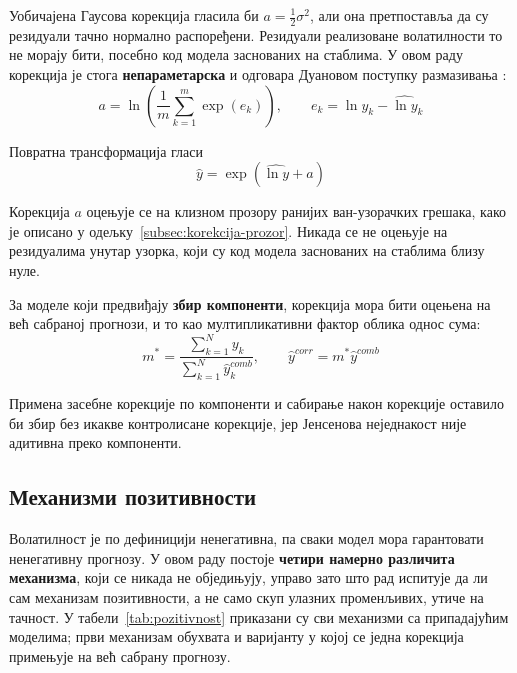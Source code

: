 Уобичајена Гаусова корекција гласила би $a = \tfrac{1}{2}\sigma^{2}$, али она
претпоставља да су резидуали тачно нормално распоређени. Резидуали реализоване
волатилности то не морају бити, посебно код модела заснованих на стаблима. У овом
раду корекција је стога \textbf{непараметарска} и одговара Дуановом поступку
размазивања \parencite{duan1983}:
\begin{equation}
a = \ln\!\left(\frac{1}{m}\sum_{k=1}^{m}\exp(e_k)\right),
\qquad
e_k = \ln y_k - \widehat{\ln y}_k
\label{eq:correction}
\end{equation}

Повратна трансформација гласи
\begin{equation}
\hat{y} = \exp\!\left(\widehat{\ln y} + a\right)
\end{equation}

Корекција $a$ оцењује се на клизном прозору ранијих ван-узорачких грешака, како је
описано у одељку~\ref{subsec:korekcija-prozor}. Никада се не оцењује на резидуалима
унутар узорка, који су код модела заснованих на стаблима близу нуле.

За моделе који предвиђају \textbf{збир компоненти}, корекција мора бити оцењена на
већ сабраној прогнози, и то као мултипликативни фактор облика однос сума:
\begin{equation}
m^{*} = \frac{\sum_{k=1}^{N} y_k}{\sum_{k=1}^{N}\hat{y}_k^{comb}},
\qquad
\hat{y}^{corr} = m^{*}\hat{y}^{comb}
\end{equation}

Примена засебне корекције по компоненти и сабирање након корекције оставило би збир
без икакве контролисане корекције, јер Јенсенова неједнакост није адитивна преко
компоненти.

\subsection{Механизми позитивности}
\label{subsec:pozitivnost}

Волатилност је по дефиницији ненегативна, па сваки модел мора гарантовати ненегативну
прогнозу. У овом раду постоје \textbf{четири намерно различита механизма}, који се
никада не обједињују, управо зато што рад испитује да ли сам механизам позитивности, а
не само скуп улазних променљивих, утиче на тачност. У табели~\ref{tab:pozitivnost}
приказани су сви механизми са припадајућим моделима; први механизам обухвата и
варијанту у којој се једна корекција примењује на већ сабрану прогнозу.

